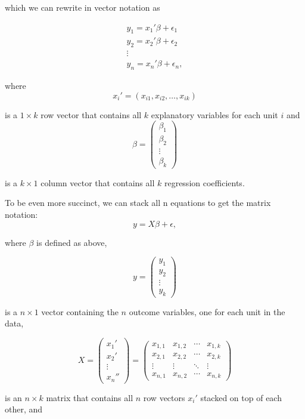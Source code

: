\documentclass[
  letterpaper,
  DIV=11,
  numbers=noendperiod]{scrreprt}
\begin{document}
which we can rewrite in vector notation as

\[
\begin{aligned}
y_1 = x_1'\beta + \epsilon_1 \\
y_2 = x_2'\beta + \epsilon_2 \\
\vdots\\
y_n = x_n'\beta + \epsilon_n,
\end{aligned}
\]

where \[
x_i' = (x_{i1}, x_{i2}, \ldots, x_{ik})
\]

is a \(1 \times k\) row vector that contains all \(k\) explanatory
variables for each unit \(i\) and \[ \beta = 
 \begin{pmatrix}
  \beta_{1}\\
  \beta_{2}\\
  \vdots \\
  \beta_{k} 
 \end{pmatrix}
\]

is a \(k \times 1\) column vector that contains all \(k\) regression
coefficients.

To be even more succinct, we can stack all n equations to get the matrix
notation: \[
y = X\beta + \epsilon,
\]

where \(\beta\) is defined as above,

\[ y = 
 \begin{pmatrix}
  y_{1}\\
  y_{2}\\
  \vdots \\
  y_{k} 
 \end{pmatrix}
\]

is a \(n \times 1\) vector containing the \(n\) outcome variables, one
for each unit in the data,

\[ X = 
 \begin{pmatrix}
  x_{1}' \\
  x_{2}' \\
  \vdots \\
  x_{n}'' 
 \end{pmatrix}
 = 
 \begin{pmatrix}
  x_{1,1} & x_{1,2} & \cdots & x_{1,k} \\
  x_{2,1} & x_{2,2} & \cdots & x_{2,k} \\
  \vdots  & \vdots  & \ddots & \vdots  \\
  x_{n,1} & x_{n,2} & \cdots & x_{n,k} 
 \end{pmatrix}
\]

is an \(n \times k\) matrix that contains all \(n\) row vectors \(x_i'\)
stacked on top of each other, and
\end{document}
